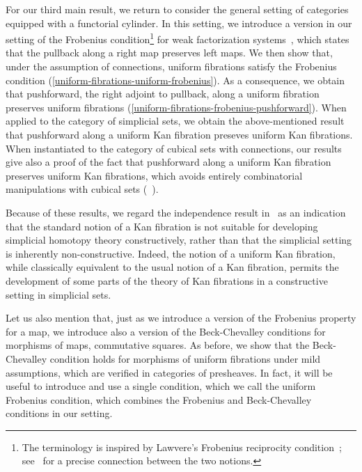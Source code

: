 \documentclass[reqno,10pt,a4paper,oneside,draft]{amsart}
\begin{document}
For our third main result, we return to consider the general setting of categories equipped with a functorial cylinder.
In this setting, we introduce a version in our setting of the Frobenius condition\footnote{The terminology is inspired by Lawvere's Frobenius reciprocity condition~\cite{lawvere-equality}; see~\cite{clementino:frobenius} for a precise connection between the two notions.} for weak factorization systems~\cite{garner:types-omega-groupoids}, which states that the pullback along a right map preserves left maps.
We then show that, under the assumption of connections, uniform fibrations satisfy the Frobenius condition (\cref{uniform-fibrations-uniform-frobenius}).
As a consequence, we obtain that pushforward, \ie the right adjoint to pullback, along a uniform fibration preserves uniform fibrations (\cref{uniform-fibrations-frobenius-pushforward}).
When applied to the category of simplicial sets, we obtain the above-mentioned result that pushforward along a uniform Kan fibration preseves uniform Kan fibrations.
When instantiated to the category of cubical sets with connections, our results give also a proof of the fact that pushforward along a uniform Kan fibration preserves uniform Kan fibrations, which avoids entirely combinatorial manipulations with cubical sets (\cf~\cite{coquand-face,coquand-variation,huber-thesis}).

Because of these results, we regard the independence result in~\cite{coquand-non-constructivity-kan} as an indication that the standard notion of a Kan fibration is not suitable for developing simplicial homotopy theory constructively, rather than that the simplicial setting is inherently non-constructive.
Indeed, the notion of a uniform Kan fibration, while classically equivalent to the usual notion of a Kan fibration, permits the development of some parts of the theory of Kan fibrations in a constructive setting in simplicial sets.

Let us also mention that, just as we introduce a version of the Frobenius property for a map, we introduce also a version of the Beck-Chevalley conditions for morphisms of maps, \ie commutative squares.
As before, we show that the Beck-Chevalley condition holds for morphisms of uniform fibrations under mild assumptions, which are verified in categories of presheaves.
In fact, it will be useful to introduce and use a single condition, which we call the uniform Frobenius condition, which combines the Frobenius and Beck-Chevalley conditions in our setting. 
\end{document}
